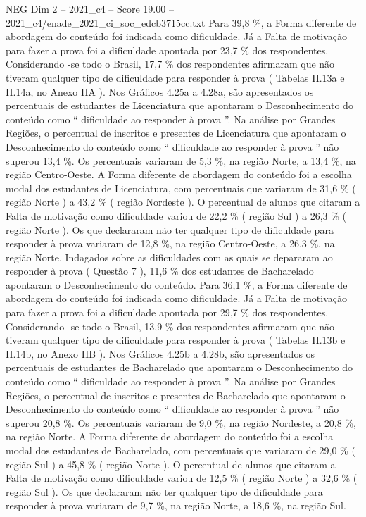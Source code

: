 \begin{textsample}{NEG Dim 2 – 2021\_c4 – Score 19.00 – 2021\_c4/enade\_2021\_ci\_soc\_edcb3715cc.txt}
Para 39,8 \%, a Forma diferente de abordagem do conteúdo foi indicada como dificuldade.
Já a Falta de motivação para fazer a prova foi a dificuldade apontada por 23,7 \% dos respondentes.
Considerando -se todo o Brasil, 17,7 \% dos respondentes afirmaram que não tiveram qualquer tipo de dificuldade para responder à prova ( Tabelas II.13a e II.14a, no Anexo IIA ).
Nos Gráficos 4.25a a 4.28a, são apresentados os percentuais de estudantes de Licenciatura que apontaram o Desconhecimento do conteúdo como “ dificuldade ao responder à prova ”.
Na análise por Grandes Regiões, o percentual de inscritos e presentes de Licenciatura que apontaram o Desconhecimento do conteúdo como “ dificuldade ao responder à prova ” não superou 13,4 \%.
Os percentuais variaram de 5,3 \%, na região Norte, a 13,4 \%, na região Centro-Oeste.
A Forma diferente de abordagem do conteúdo foi a escolha modal dos estudantes de Licenciatura, com percentuais que variaram de 31,6 \% ( região Norte ) a 43,2 \% ( região Nordeste ).
O percentual de alunos que citaram a Falta de motivação como dificuldade variou de 22,2 \% ( região Sul ) a 26,3 \% ( região Norte ).
Os que declararam não ter qualquer tipo de dificuldade para responder à prova variaram de 12,8 \%, na região Centro-Oeste, a 26,3 \%, na região Norte.
Indagados sobre as dificuldades com as quais se depararam ao responder à prova ( Questão 7 ), 11,6 \% dos estudantes de Bacharelado apontaram o Desconhecimento do conteúdo.
Para 36,1 \%, a Forma diferente de abordagem do conteúdo foi indicada como dificuldade.
Já a Falta de motivação para fazer a prova foi a dificuldade apontada por 29,7 \% dos respondentes.
Considerando -se todo o Brasil, 13,9 \% dos respondentes afirmaram que não tiveram qualquer tipo de dificuldade para responder à prova ( Tabelas II.13b e II.14b, no Anexo IIB ).
Nos Gráficos 4.25b a 4.28b, são apresentados os percentuais de estudantes de Bacharelado que apontaram o Desconhecimento do conteúdo como “ dificuldade ao responder à prova ”.
Na análise por Grandes Regiões, o percentual de inscritos e presentes de Bacharelado que apontaram o Desconhecimento do conteúdo como “ dificuldade ao responder à prova ” não superou 20,8 \%.
Os percentuais variaram de 9,0 \%, na região Nordeste, a 20,8 \%, na região Norte.
A Forma diferente de abordagem do conteúdo foi a escolha modal dos estudantes de Bacharelado, com percentuais que variaram de 29,0 \% ( região Sul ) a 45,8 \% ( região Norte ).
O percentual de alunos que citaram a Falta de motivação como dificuldade variou de 12,5 \% ( região Norte ) a 32,6 \% ( região Sul ).
Os que declararam não ter qualquer tipo de dificuldade para responder à prova variaram de 9,7 \%, na região Norte, a 18,6 \%, na região Sul.

\end{textsample}
